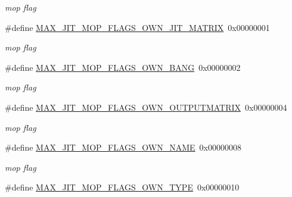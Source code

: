 \begin{DoxyCompactItemize}
\begin{DoxyCompactList}\small\item\em mop flag \item\end{DoxyCompactList}\item 
\hypertarget{group__jitter_ga76b29cb7bf7f194cef194fb65df28ddd}{
\#define \hyperlink{group__jitter_ga76b29cb7bf7f194cef194fb65df28ddd}{MAX\_\-JIT\_\-MOP\_\-FLAGS\_\-OWN\_\-JIT\_\-MATRIX}~0x00000001}
\label{group__jitter_ga76b29cb7bf7f194cef194fb65df28ddd}

\begin{DoxyCompactList}\small\item\em mop flag \item\end{DoxyCompactList}\item 
\hypertarget{group__jitter_gae93fd085f28675389848233a82521942}{
\#define \hyperlink{group__jitter_gae93fd085f28675389848233a82521942}{MAX\_\-JIT\_\-MOP\_\-FLAGS\_\-OWN\_\-BANG}~0x00000002}
\label{group__jitter_gae93fd085f28675389848233a82521942}

\begin{DoxyCompactList}\small\item\em mop flag \item\end{DoxyCompactList}\item 
\hypertarget{group__jitter_ga7c51c91474bdbc40437dbd946df19cc5}{
\#define \hyperlink{group__jitter_ga7c51c91474bdbc40437dbd946df19cc5}{MAX\_\-JIT\_\-MOP\_\-FLAGS\_\-OWN\_\-OUTPUTMATRIX}~0x00000004}
\label{group__jitter_ga7c51c91474bdbc40437dbd946df19cc5}

\begin{DoxyCompactList}\small\item\em mop flag \item\end{DoxyCompactList}\item 
\hypertarget{group__jitter_ga2da79e2f2413304655b66637eeff0326}{
\#define \hyperlink{group__jitter_ga2da79e2f2413304655b66637eeff0326}{MAX\_\-JIT\_\-MOP\_\-FLAGS\_\-OWN\_\-NAME}~0x00000008}
\label{group__jitter_ga2da79e2f2413304655b66637eeff0326}

\begin{DoxyCompactList}\small\item\em mop flag \item\end{DoxyCompactList}\item 
\hypertarget{group__jitter_gaf85d3bada9b15b7c5371e4cbeeffcaeb}{
\#define \hyperlink{group__jitter_gaf85d3bada9b15b7c5371e4cbeeffcaeb}{MAX\_\-JIT\_\-MOP\_\-FLAGS\_\-OWN\_\-TYPE}~0x00000010}
\label{group__jitter_gaf85d3bada9b15b7c5371e4cbeeffcaeb}


\end{DoxyCompactItemize}
